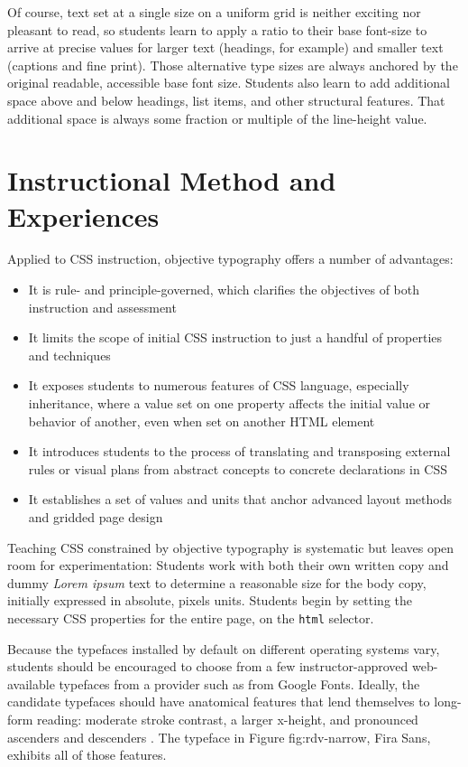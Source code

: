 \documentclass[sigplan,screen]{acmart}
\begin{document}
Of course, text set at a single size on a uniform grid is neither exciting nor pleasant to read, so students learn to apply a ratio to their base font-size to arrive at precise values for larger text (headings, for example) and smaller text (captions and fine print). Those alternative type sizes are always anchored by the original readable, accessible base font size. Students also learn to add additional space above and below headings, list items, and other structural features. That additional space is always some fraction or multiple of the line-height value.

\section{Instructional Method and Experiences}

Applied to CSS instruction, objective typography offers a number of advantages:

\begin{itemize}
  \item It is rule- and principle-governed, which clarifies the objectives of both instruction and assessment
  \item It limits the scope of initial CSS instruction to just a handful of properties and techniques
  \item It exposes students to numerous features of CSS language, especially inheritance, where a value set on one property affects the initial value or behavior of another, even when set on another HTML element
  \item It introduces students to the process of translating and transposing external rules or visual plans from abstract concepts to concrete declarations in CSS
  \item It establishes a set of values and units that anchor advanced layout methods and gridded page design
\end{itemize}

Teaching CSS constrained by objective typography is systematic but leaves open room for experimentation: Students work with both their own written copy and dummy {\itshape Lorem ipsum} text to determine a reasonable size for the body copy, initially expressed in absolute, pixels units. Students begin by setting the necessary CSS properties for the entire page, on the \verb|html| selector.

Because the typefaces installed by default on different operating systems vary, students should be encouraged to choose from a few instructor-approved web-available typefaces from a provider such as from Google Fonts. Ideally, the candidate typefaces should have anatomical features that lend themselves to long-form reading: moderate stroke contrast, a larger x-height, and pronounced ascenders and descenders \cite[p.~36]{jsm:owt}. The typeface in Figure {fig:rdv-narrow}, Fira Sans, exhibits all of those features.
\end{document}
